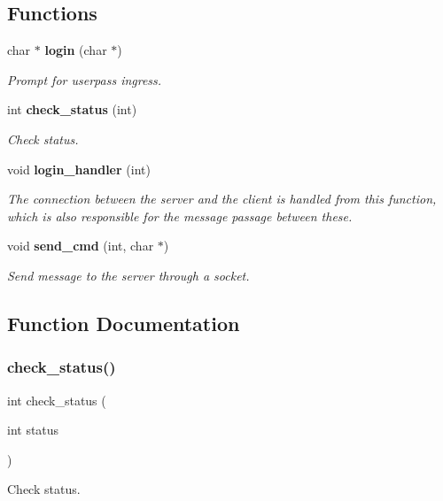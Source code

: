 \subsection*{Functions}
\begin{DoxyCompactItemize}
\item 
char $\ast$ \textbf{ login} (char $\ast$)
\begin{DoxyCompactList}\small\item\em Prompt for userpass ingress. \end{DoxyCompactList}\item 
int \textbf{ check\+\_\+status} (int)
\begin{DoxyCompactList}\small\item\em Check status. \end{DoxyCompactList}\item 
void \textbf{ login\+\_\+handler} (int)
\begin{DoxyCompactList}\small\item\em The connection between the server and the client is handled from this function, which is also responsible for the message passage between these. \end{DoxyCompactList}\item 
void \textbf{ send\+\_\+cmd} (int, char $\ast$)
\begin{DoxyCompactList}\small\item\em Send message to the server through a socket. \end{DoxyCompactList}\end{DoxyCompactItemize}


\subsection{Function Documentation}
\mbox{\label{client_8h_af8b753753a0d32bcef5a40e1a49b7a18}} 
\subsubsection{check\+\_\+status()}
{\footnotesize\ttfamily int check\+\_\+status (\begin{DoxyParamCaption}\item[{int}]{status }\end{DoxyParamCaption})}



Check status. 


